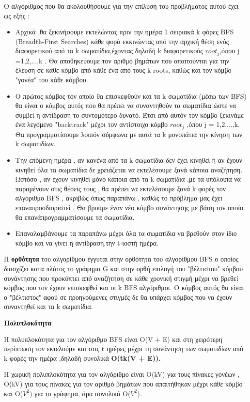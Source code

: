 \documentclass[12pt,a4paper]{article}
\begin{document}
\par 
O αλγόριθμος που θα ακολουθήσουμε για την επίλυση του προβλήματος αυτού έχει ως εξής : 
\begin{itemize}
    \item Αρχικά ,θα ξεκινήσουμε εκτελώντας πριν την ημέρα 1 σειριακά k φόρες BFS (Breadth-First Searches) κάθε φορά εκκινώντας από την αρχική θέση ενός διαφορετικού από τα k σωματίδια,έχοντας δηλαδή k διαφορετικούς $root_j$,όπου j =1,2,...,k . Θα αποθηκεύουμε τον αριθμό βημάτων που απαιτούνται για την έλευση σε κάθε κόμβο από κάθε ένα από τους k roots, καθώς και τον κόμβο "γονέα" του κάθε κόμβου. 
    \item Ο πρώτος κόμβος τον οποίο θα επισκεφθούν και τα k σωματίδια (μέσω των BFS) θα είναι ο κόμβος αυτός που θα πρέπει να συναντηθούν τα σωματίδια ώστε να συμβεί η αντίδραση το συντομότερο δυνατό. Έτσι από αυτόν τον κόμβο ξεκινάμε ένα λεγόμενο "backtrack" μέχρι τον αντίστοιχο κόμβο $root_j$ ,όπου j = 1,2,...,k. Θα προγραμματίσουμε λοιπόν σύμφωνα με αυτά τα k μονοπάτια την κίνηση των k σωματιδίων.
    \item Την επόμενη ημέρα , αν κανένα από τα k σωματίδια δεν έχει κινηθεί ή αν έχουν κινηθεί όλα τα σωματίδια δε χρειάζεται να εκτελέσουμε ξανά κάποια αναζήτηση. Ωστόσο , αν έχουν κινηθεί μόνο κάποια από τα k σωματίδια ,με τα υπόλοιπα να παραμένουν στις θέσεις τους , θα πρέπει να εκτελέσουμε ξανά k φορές τον αλγόριθμο BFS , ακριβώς όπως παραπάνω , καθώς το πρόβλημα μας έχει επαναπροσδιοριστεί . Θα βρούμε έναν νέο κόμβο συνάντησης με βάση τον οποίο θα επανάπρογραμματίσουμε τα σωματίδια.
    \item Επαναλαμβάνουμε τα παραπάνω μέχρι όλα τα σωματίδια να βρεθούν στον ίδιο κόμβο και να γίνει η αντίδραση,την t-ιοστή ημέρα.\\
\end{itemize}
\newpage 
\par Η \textbf{ορθότητα} του αλγορίθμου έγγυται στην ορθότητα του αλγορίθμου BFS  ο οποίος διασχίζει κατα πλάτος το γράφημα G και στην ορθή επιλογή του "βέλτιστου" κόμβου συνάντησης που προκύπτει από αναζήτηση σε κάθε χρονική στιγμή μέχρι να βρεθεί κόμβος που τον έχουν επισκεφθεί και οι k BFS αλγόριθμοι. Ο κόμβος αυτός θα είναι ο "βέλτιστος" αφού σε προηγούμενες στιγμές δε θα υπάρχει κόμβος που να έχουν συναντηθεί και τα k σωματίδια.

\begin{center}
    \textbf{Πολυπλοκότητα}
\end{center}

Η πολυπλοκότητα για τον αλγόριθμο BFS είναι O(V + E) και στη χειρότερη περίπτωση τον εκτελούμε και στις t ημέρες μέχρι τη συνάντηση των σωματιδίων από k φορές την ημέρα ,δηλαδή συνολικά \textbf{ O(tk(V + E)). }
\par Η χωρική πολυπλοκότητα για τον αλγόριθμο είναι O(kV) για τους πίνακες γονέων , Ο(kV) για τους πίνακες για τον αριθμό βημάτων που απαιτήθηκαν μέχρι κάθε κόμβο και O($V^2$) για το γράφημα, άρα συνολικά {O($V^2$)}.\\\\
\end{document}
